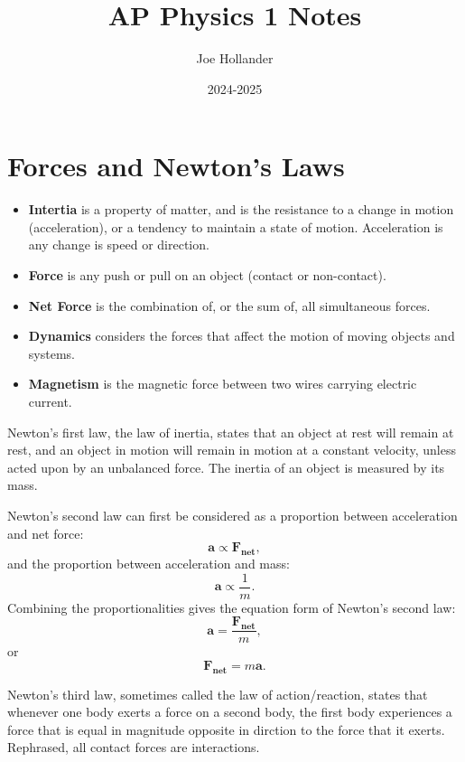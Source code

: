 \documentclass{article}
\title{AP Physics 1 Notes}
\author{Joe Hollander}
\date{2024-2025}
\begin{document}
\maketitle 

\section*{Forces and Newton's Laws}
\begin{itemize} 
    \item \textbf{Intertia} is a property of matter, 
and is the resistance to a change in motion (acceleration),
or a tendency to maintain a state of motion. 
Acceleration is any change is speed or direction.

    \item \textbf{Force} is any push or pull on an object (contact or non-contact).
    \item \textbf{Net Force} is the combination of, or the sum of, all simultaneous forces.
    \item \textbf{Dynamics} considers the forces that affect the motion of moving objects and systems. 
    \item \textbf{Magnetism} is the magnetic force between two wires carrying electric current. 
\end{itemize}

Newton's first law, the law of inertia, states that an object at rest will remain at rest, 
and an object in motion will remain in motion at a constant velocity, unless acted upon by an unbalanced force.
The inertia of an object is measured by its mass. 

Newton's second law can first be considered as a proportion between acceleration and net force: 
\[
\mathbf{a \propto F_{net}}, 
\]
and the proportion between acceleration and mass:
\[
\mathbf{a} \propto \frac{1}{m}.
\]
Combining the proportionalities gives the equation form of Newton's second law:
\[
\mathbf{a} = \frac{\mathbf{F_{net}}}{m}, 
\]
or
\[
\mathbf{F_{net}} = m\mathbf{a}.
\]

Newton's third law, sometimes called the law of action/reaction, states that whenever one body exerts a force on a second body, 
the first body experiences a force that is equal in magnitude opposite in dirction to the force that it exerts.
Rephrased, all contact forces are interactions. 
\end{document}
